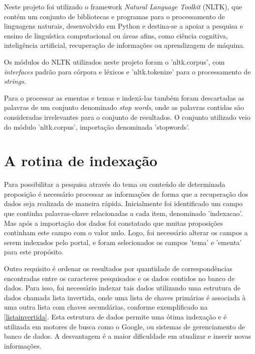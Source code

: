 \documentclass[
	12pt,				%
	openright,			%
	twoside,			%
	a4paper,			%
	english,			%
	french,				%
	spanish,			%
	brazil				%
	]{abntex2}
\begin{document}
{Neste projeto foi utilizado o framework \emph{Natural Language Toolkit} (NLTK), que contém um conjunto de bibliotecas e programas 
para o processamento de linguagens naturais, desenvolvido em Python e destina-se a apoiar a pesquisa e ensino de linguística 
computacional ou áreas afins, como ciência cognitiva, inteligência artificial, recuperação de informações ou aprendizagem de máquina.

Os módulos do NLTK utilizados neste projeto foram o 'nltk.corpus', com \emph{interfaces} padrão para córpora e léxicos e 'nltk.tokenize'
para o processamento de \emph{strings}.

Para o processar as ementas e temas e indexá-las também foram descartadas as palavras de um conjunto denominado \emph{stop words},
onde as palavras contidas são consideradas irrelevantes para o conjunto de resultados. O conjunto utilizado veio do módulo 
'nltk.corpus', importação denominada 'stopwords'.


\section{A rotina de indexação}
Para possibilitar a pesquisa através do tema ou conteúdo de determinada proposição é necessário processar as informações de forma que a 
recuperação dos dados seja realizada de maneira rápida. Inicialmente foi identificado um campo que continha palavras-chave relacionadas a cada item, denominado 'indexacao'. Mas
após a importação dos dados foi constatado que muitas proposições continham este campo com o valor nulo. Logo, foi necessário alterar os campos a serem indexados 
pelo portal, e foram selecionados os campos 'tema' e 'ementa' para este propósito.

Outro requisito é ordenar os resultados por quantidade de correspondências
encontradas entre os caracteres pesquisados e os dados contidos no banco de dados. Para isso, foi necessário indexar tais dados utilizando uma estrutura
de dados chamada lista invertida, onde uma lista de chaves primárias é associada à uma outra lista com chaves secundárias, conforme 
exemplificado na \autoref{listainvertida}. Esta
estrutura de dados permite uma ótima indexação e é utilizada em motores de busca como o Google, ou sistemas de gerenciamento de 
banco de dados. A desvantagem é a maior dificuldade em atualizar e inserir novas informações.

}
\end{document}
